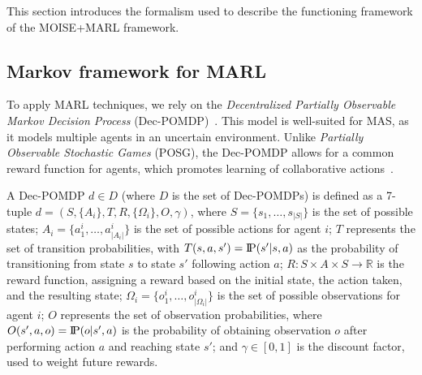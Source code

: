 \documentclass[sigconf,anonymous]{aamas}
\newcommand{\probP}{\text{I\kern-0.15em P}}
\begin{document}
This section introduces the formalism used to describe the functioning framework of the MOISE+MARL framework.

\subsection{Markov framework for MARL}

To apply MARL techniques, we rely on the \textit{Decentralized Partially Observable Markov Decision Process} (Dec-POMDP)~\citep{Oliehoek2016}. This model is well-suited for MAS, as it models multiple agents in an uncertain environment. Unlike \textit{Partially Observable Stochastic Games} (POSG), the Dec-POMDP allows for a common reward function for agents, which promotes learning of collaborative actions~\citep{Beynier2013}.

A Dec-POMDP $d \in D$ (where $D$ is the set of Dec-POMDPs) is defined as a 7-tuple $d = (S, \{A_i\}, T, R, \{\Omega_i\}, O, \gamma)$, where $S = \{s_1,\dots,s_{|S|}\}$ is the set of possible states; $A_{i} = \{a_{1}^{i},\dots,a_{|A_{i}|}^{i}\}$ is the set of possible actions for agent $i$; $T$ represents the set of transition probabilities, with $T(s,a,s') = \probP(s'|s,a)$ as the probability of transitioning from state $s$ to state $s'$ following action $a$; $R: S \times A \times S \rightarrow \mathbb{R}$ is the reward function, assigning a reward based on the initial state, the action taken, and the resulting state; $\Omega_{i} = \{o_{1}^{i},\dots,o_{|\Omega_{i}|}^{i}\}$ is the set of possible observations for agent $i$; $O$ represents the set of observation probabilities, where $O(s',a,o) = \probP(o|s',a)$ is the probability of obtaining observation $o$ after performing action $a$ and reaching state $s'$; and $\gamma \in [0,1]$ is the discount factor, used to weight future rewards.
\end{document}
